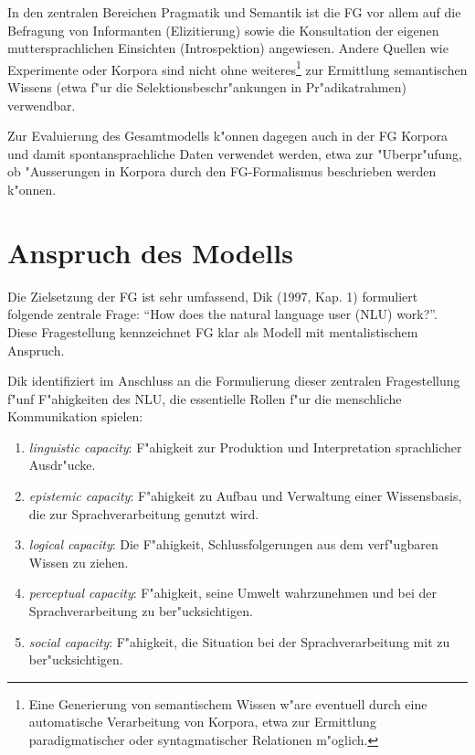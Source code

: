 \documentclass[a4paper]{article}
\begin{document}
In den zentralen Bereichen Pragmatik und Semantik ist die FG
vor allem auf die Befragung von Informanten (Elizitierung) sowie die
Konsultation der eigenen muttersprachlichen Einsichten (Introspektion)
angewiesen.  Andere Quellen wie Experimente oder Korpora sind nicht ohne
weiteres\footnote{Eine Generierung von semantischem Wissen w"are eventuell
durch eine automatische Verarbeitung von Korpora, etwa zur Ermittlung
paradigmatischer oder syntagmatischer Relationen m"oglich.} zur Ermittlung
semantischen Wissens (etwa f"ur die Selektionsbeschr"ankungen in
Pr"adikatrahmen) verwendbar.

Zur Evaluierung des Gesamtmodells k"onnen dagegen auch in der FG Korpora und
damit spontansprachliche Daten verwendet werden, etwa zur "Uberpr"ufung, ob
"Ausserungen in Korpora durch den FG-Formalismus beschrieben werden k"onnen.

\section{Anspruch des Modells} \label{kriterien} \label{mentalistisch} \label{universalistisch}

Die Zielsetzung der FG ist sehr umfassend, Dik (1997, Kap. 1) formuliert
folgende zentrale Frage: ``How does the natural language user (NLU) work?''.
Diese Fragestellung kennzeichnet FG klar als Modell mit mentalistischem
Anspruch.

Dik identifiziert im Anschluss an die Formulierung dieser zentralen
Fragestellung f"unf F"ahigkeiten des NLU, die essentielle Rollen f"ur die
menschliche Kommunikation spielen:

\begin{enumerate}
  \item {\emph{linguistic capacity}: F"ahigkeit zur Produktion und
  Interpretation sprachlicher Ausdr"ucke.}
  \item {\emph{epistemic capacity}: F"ahigkeit zu Aufbau und Verwaltung einer
  Wissensbasis, die zur Sprachverarbeitung genutzt wird.}
  \item {\emph{logical capacity}: Die F"ahigkeit, Schlussfolgerungen aus dem
  verf"ugbaren Wissen zu ziehen.}
  \item {\emph{perceptual capacity}: F"ahigkeit, seine Umwelt wahrzunehmen und
  bei der Sprachverarbeitung zu ber"ucksichtigen.}
  \item {\emph{social capacity}: F"ahigkeit, die Situation bei der
  Sprachverarbeitung mit zu ber"ucksichtigen.}
\end{enumerate}
\end{document}
